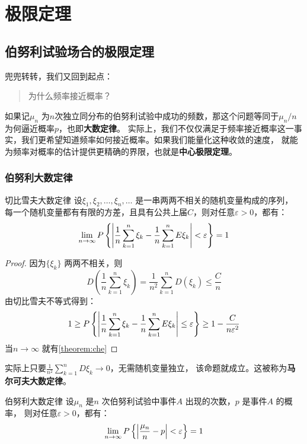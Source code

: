\chapter{极限定理}
\section{伯努利试验场合的极限定理}
兜兜转转，我们又回到起点：
\begin{quote}
    为什么频率接近概率？
\end{quote}

如果记\(\mu_{n}\) 为\(n\)次独立同分布的伯努利试验中成功的频数，那这个问题等同于\(\mu_{n}/n\)
为何逼近概率\(p\)，也即\textbf{大数定律}。
实际上，我们不仅仅满足于频率接近概率这一事实，我们更希望知道频率如何接近概率。如果我们能量化这种收敛的速度，
就能为频率对概率的估计提供更精确的界限，也就是\textbf{中心极限定理}。
\subsection{伯努利大数定律}
\begin{theorem}[che]{切比雪夫大数定律}
    设\(\xi_{1}, \xi_2, \dots ,\xi_{n},\dots \) 是一串两两不相关的随机变量构成的序列，
    每一个随机变量都有有限的方差，且具有公共上届\(C\)，则对任意\(\varepsilon>0\)，都有：
    \[
        \lim_{n \to \infty} P\left\{\left|\frac{1}{n} \sum_{k=1}^{n} \xi_{k} -
        \frac{1}{n} \sum_{k=1}^{n} E\xi_{k}\right| < \varepsilon\right\} = 1
    \]
\end{theorem}

\begin{proof}
    因为\(\{\xi_{k}\}\) 两两不相关，则\[
        D\left( \frac{1}{n} \sum_{k=1}^{n} \xi_{k} \right) =
        \frac{1}{n^2} \sum_{k=1}^{n} D(\xi_{k}) \leq \frac{C}{n}
    \]
    由切比雪夫不等式得到：
    \[
        1 \geq P\left\{\left|\frac{1}{n} \sum_{k=1}^{n} \xi_{k} -
        \frac{1}{n} \sum_{k=1}^{n} E\xi_{k}\right| \leq  \varepsilon\right\} \geq
        1- \frac{C}{n\varepsilon^2}
    \]
    当\(n\to \infty\) 就有\cref{theorem:che}
\end{proof}

实际上只要\(\frac{1}{n^{2}} \sum_{k=1}^{n} D\xi_{k} \to 0\)，无需随机变量独立，
该命题就成立。这被称为\textbf{马尔可夫大数定律}。

\begin{theorem}{伯努利大数定律}
    设\(\mu_{n}\) 是\(n\) 次伯努利试验中事件\(A\) 出现的次数，\(p\) 是事件\(A\) 的概率，
    则对任意\(\varepsilon>0\)，都有：
    \[
        \lim_{n \to \infty} P\left\{\left| \frac{\mu_{n}}{n} - p\right| < \varepsilon\right\} = 1
    \]
\end{theorem}

